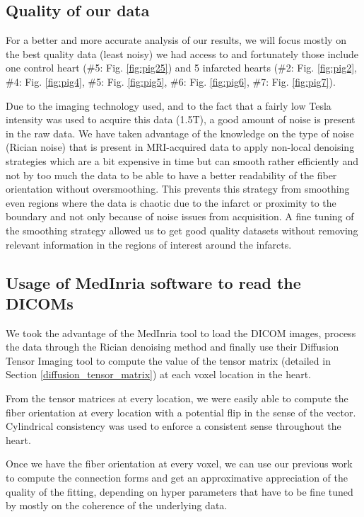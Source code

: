 \subsection{Quality of our data}

For a better and more accurate analysis of our results, we will focus mostly on the best quality data (least noisy) we had access to and fortunately those include one control heart (\#5: Fig. \ref{fig:pig25}) and 5 infarcted hearts (\#2: Fig. \ref{fig:pig2}, \#4: Fig. \ref{fig:pig4}, \#5: Fig. \ref{fig:pig5}, \#6: Fig. \ref{fig:pig6}, \#7: Fig. \ref{fig:pig7}).

Due to the imaging technology used, and to the fact that a fairly low Tesla intensity was used to acquire this data (1.5T), a good amount of noise is present in the raw data. We have taken advantage of the knowledge on the type of noise (Rician noise) that is present in MRI-acquired data to apply non-local denoising strategies which are a bit expensive in time but can smooth rather efficiently and not by too much the data to be able to have a better readability of the fiber orientation without oversmoothing. This prevents this strategy from smoothing even regions where the data is chaotic due to the infarct or proximity to the boundary and not only because of noise issues from acquisition. A fine tuning of the smoothing strategy allowed us to get good quality datasets without removing relevant information in the regions of interest around the infarcts.

\subsection{Usage of MedInria software to read the DICOMs}

We took the advantage of the MedInria tool to load the DICOM images, process the data through the Rician denoising method and finally use their Diffusion Tensor Imaging tool to compute the value of the tensor matrix (detailed in Section \ref{diffusion_tensor_matrix}) at each voxel location in the heart.

From the tensor matrices at every location, we were easily able to compute the fiber orientation at every location with a potential flip in the sense of the vector. Cylindrical consistency was used to enforce a consistent sense throughout the heart.

Once we have the fiber orientation at every voxel, we can use our previous work to compute the connection forms and get an approximative appreciation of the quality of the fitting, depending on hyper parameters that have to be fine tuned by mostly on the coherence of the underlying data.